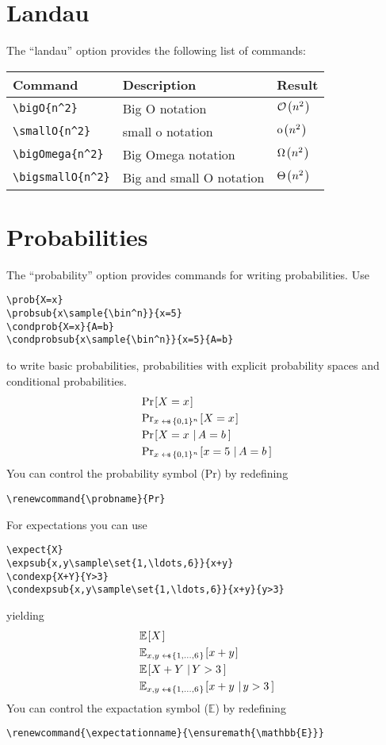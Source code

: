 \documentclass[a4paper]{report}
\begin{document}
\section{Landau}
The \enquote{landau} option provides the following list of commands:

\begin{center}
\begin{tabular}{l l l}
\textbf{Command} & \textbf{Description} & \textbf{Result} \\\hline
\lstinline$\bigO{n^2}$ & Big O notation & $\bigO{n^2}$  \\
\lstinline$\smallO{n^2}$ & small o notation & $\smallO{n^2}$  \\
\lstinline$\bigOmega{n^2}$ & Big Omega notation & $\bigOmega{n^2}$  \\
\lstinline$\bigsmallO{n^2}$ & Big and small O notation & $\bigsmallO{n^2}$
\end{tabular}
\end{center}


\section{Probabilities}
The \enquote{probability} option provides commands for writing probabilities. Use
\begin{lstlisting}
\prob{X=x}
\probsub{x\sample{\bin^n}}{x=5}
\condprob{X=x}{A=b}
\condprobsub{x\sample{\bin^n}}{x=5}{A=b}
\end{lstlisting}
to write basic probabilities, probabilities with explicit probability spaces and conditional probabilities.
\begin{align*}
& \prob{X=x} \\
& \probsub{x\sample{\bin^n}}{X=x} \\
& \condprob{X=x}{A=b} \\
& \condprobsub{x\sample{\bin^n}}{x=5}{A=b}
\end{align*}
You can control the probability symbol (Pr) by redefining
\begin{lstlisting}
\renewcommand{\probname}{Pr}
\end{lstlisting}

For expectations you can use
\begin{lstlisting}
\expect{X}
\expsub{x,y\sample\set{1,\ldots,6}}{x+y}
\condexp{X+Y}{Y>3}
\condexpsub{x,y\sample\set{1,\ldots,6}}{x+y}{y>3}
\end{lstlisting}
yielding
\begin{align*}
& \expect{X} \\
& \expsub{x,y\sample\set{1,\ldots,6}}{x+y} \\
& \condexp{X+Y}{Y>3} \\
& \condexpsub{x,y\sample\set{1,\ldots,6}}{x+y}{y>3}
\end{align*}
You can control the expactation symbol ($\mathbb{E}$) by redefining
\begin{lstlisting}
\renewcommand{\expectationname}{\ensuremath{\mathbb{E}}}
\end{lstlisting}
\end{document}
